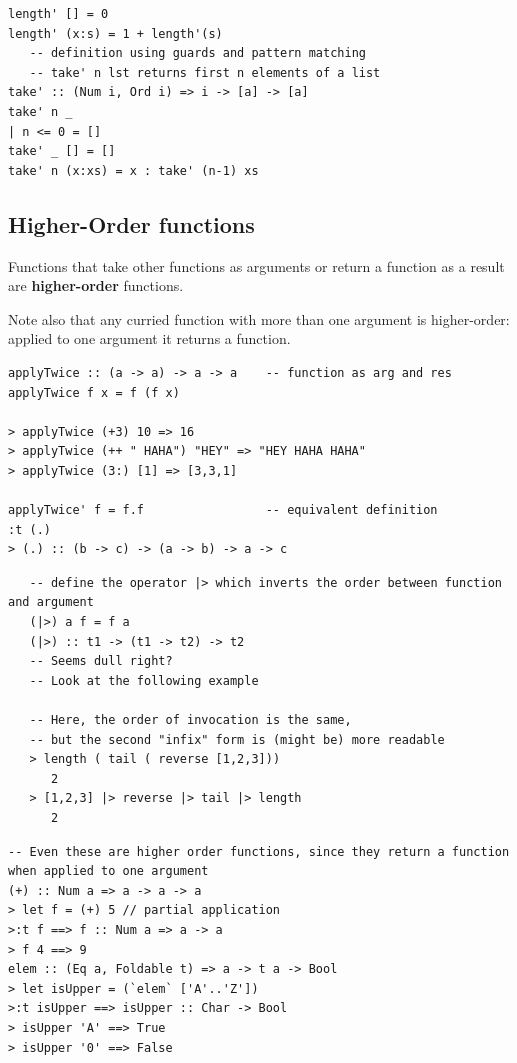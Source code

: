 \begin{lstlisting}
length' [] = 0
length' (x:s) = 1 + length'(s)
   -- definition using guards and pattern matching
   -- take' n lst returns first n elements of a list
take' :: (Num i, Ord i) => i -> [a] -> [a]
take' n _
| n <= 0 = []
take' _ [] = []
take' n (x:xs) = x : take' (n-1) xs
\end{lstlisting}

\subsection{Higher-Order functions}
Functions that take other functions as arguments or return a function as a result are \textbf{higher-order} functions.

Note also that any curried function with more than one argument is higher-order: applied to one argument it returns a function.

\begin{lstlisting}
applyTwice :: (a -> a) -> a -> a    -- function as arg and res
applyTwice f x = f (f x)

> applyTwice (+3) 10 => 16
> applyTwice (++ " HAHA") "HEY" => "HEY HAHA HAHA"
> applyTwice (3:) [1] => [3,3,1]

applyTwice' f = f.f                 -- equivalent definition
:t (.)
> (.) :: (b -> c) -> (a -> b) -> a -> c
\end{lstlisting}

\begin{lstlisting}
   -- define the operator |> which inverts the order between function and argument
   (|>) a f = f a
   (|>) :: t1 -> (t1 -> t2) -> t2
   -- Seems dull right?
   -- Look at the following example
   
   -- Here, the order of invocation is the same,
   -- but the second "infix" form is (might be) more readable
   > length ( tail ( reverse [1,2,3])) 
      2
   > [1,2,3] |> reverse |> tail |> length 
      2
\end{lstlisting}

\begin{lstlisting}
-- Even these are higher order functions, since they return a function when applied to one argument
(+) :: Num a => a -> a -> a
> let f = (+) 5 // partial application
>:t f ==> f :: Num a => a -> a
> f 4 ==> 9
elem :: (Eq a, Foldable t) => a -> t a -> Bool
> let isUpper = (`elem` ['A'..'Z'])
>:t isUpper ==> isUpper :: Char -> Bool
> isUpper 'A' ==> True
> isUpper '0' ==> False
\end{lstlisting}

